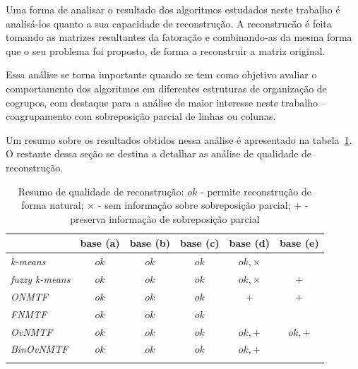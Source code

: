 \documentclass[
    12pt,                %
    oneside,            %
    a4paper,            %
    english,            %
    brazil                %
    ]{abntex2ppgsi}
\begin{document}
Uma forma de analisar o resultado dos algoritmos estudados neste trabalho é analisá-los quanto a sua capacidade de reconstrução.
A reconstrucão é feita tomando as matrizes resultantes da fatoração e combinando-as da mesma forma que o seu problema foi proposto, de forma a reconstruir a matriz original.

Essa análise se torna importante quando se tem como objetivo avaliar o comportamento dos algoritmos em diferentes estruturas de organização de cogrupos, com destaque para a análise de maior interesse neste trabalho -- coagrupamento com sobreposição parcial de linhas ou colunas.

Um resumo sobre os resultados obtidos nessa análise é apresentado na tabela~\ref{tab:resumoREC}.
O restante dessa seção se destina a detalhar as análise de qualidade de reconstrução.

\begin{table}[htpb]
\centering
    \caption{Resumo de qualidade de reconstrução: $ok$ - permite reconstrução de forma natural; $\times$ - sem informação sobre sobreposição parcial; $+$ - preserva informação de sobreposição parcial}
        \begin{tabular}{lccccc}
            \hline
            & \textbf{base (a)} & \textbf{base (b)} & \textbf{base (c)} & \textbf{base (d)}& \textbf{base (e)} \\
            \hline
            \textit{k-means}       & $ok$ & $ok$ & $ok$ & $ok, \times$ &     \\
            \textit{fuzzy k-means} & $ok$ & $ok$ & $ok$ & $ok, \times$ & $+$ \\
            \textit{ONMTF}         & $ok$ & $ok$ & $ok$ & $+$          & $+$ \\
            \textit{FNMTF}         & $ok$ & $ok$ & $ok$ &              &     \\
            \textit{OvNMTF}        & $ok$ & $ok$ & $ok$ & $ok, +$      & $ok, +$ \\
            \textit{BinOvNMTF}     & $ok$ & $ok$ & $ok$ & $ok, +       $ &   \\
            \hline
             & & & & &  \\
        \end{tabular}
    \label{tab:resumoREC}
\end{table}
\end{document}
